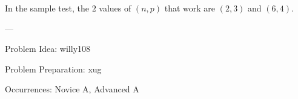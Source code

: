 In the sample test, the $2$ values of $(n,p)$ that work are $(2,3)$ and $(6,4)$.

---

Problem Idea: willy108

Problem Preparation: xug

Occurrences: Novice A, Advanced A
